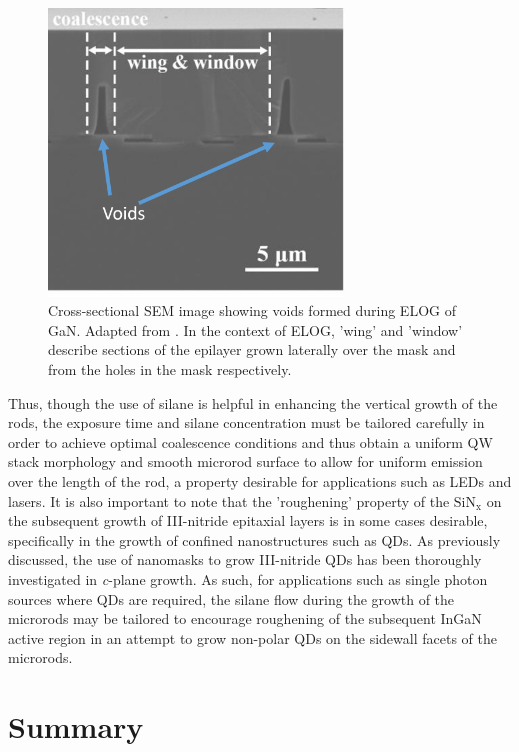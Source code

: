 \begin{figure}[!h]
	\centering
	\includegraphics[width=0.7\textwidth]{Figs/Ch6/voidsELOG}
	\caption{Cross-sectional SEM image showing voids formed during ELOG of GaN. Adapted from \cite{Ji2016}. In the context of ELOG, 'wing' and 'window' describe sections of the epilayer grown laterally over the mask and from the holes in the mask respectively.}
	\label{ELOGvoids}
\end{figure}
\FloatBarrier 

Thus, though the use of silane is helpful in enhancing the vertical growth of the rods, the exposure time and silane concentration must be tailored carefully in order to achieve optimal coalescence conditions and thus obtain a uniform QW stack morphology and smooth microrod surface to allow for uniform emission over the length of the rod, a property desirable for applications such as LEDs and lasers. It is also important to note that the 'roughening' property of the $\mathrm{SiN_{x}}$ on the subsequent growth of III-nitride epitaxial layers is in some cases desirable, specifically in the growth of confined nanostructures such as QDs. As previously discussed, the use of nanomasks to grow III-nitride QDs \cite{Tanaka1996,Tu2004,Te-Chung2006} has been thoroughly investigated in \textit{c}-plane growth. As such, for applications such as single photon sources where QDs are required, the silane flow during the growth of the microrods may be tailored to encourage roughening of the subsequent InGaN active region in an attempt to grow non-polar QDs on the sidewall facets of the microrods. 


\section{Summary}

